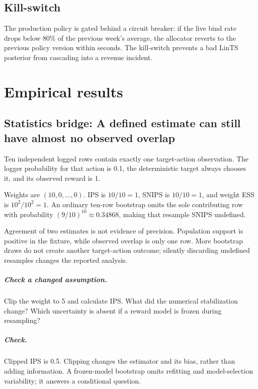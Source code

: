 \documentclass[11pt,oneside]{scrbook}
\begin{document}
\section{Kill-switch}

The production policy is gated behind a circuit breaker: if the live
bind rate drops below 80\% of the previous week's average, the allocator
reverts to the previous policy version within seconds. The kill-switch
prevents a bad LinTS posterior from cascading into a revenue incident.

\chapter{Empirical results}

\section{Statistics bridge: A defined estimate can still have almost no observed overlap}
\begin{example}
Ten independent logged rows contain exactly one target-action observation. The logger probability for that action is 0.1, the deterministic target always chooses it, and its observed reward is 1.

Weights are $(10,0,\ldots,0)$. IPS is $10/10=1$, SNIPS is $10/10=1$, and weight ESS is $10^2/10^2=1$. An ordinary ten-row bootstrap omits the sole contributing row with probability $(9/10)^{10}\approx0.34868$, making that resample SNIPS undefined.
\end{example}
Agreement of two estimates is not evidence of precision. Population support is positive in the fixture, while observed overlap is only one row. More bootstrap draws do not create another target-action outcome; silently discarding undefined resamples changes the reported analysis.

\paragraph{Check a changed assumption.} Clip the weight to 5 and calculate IPS. What did the numerical stabilization change? Which uncertainty is absent if a reward model is frozen during resampling?
\paragraph{Check.} Clipped IPS is 0.5. Clipping changes the estimator and its bias, rather than adding information. A frozen-model bootstrap omits refitting and model-selection variability; it answers a conditional question.
\end{document}
